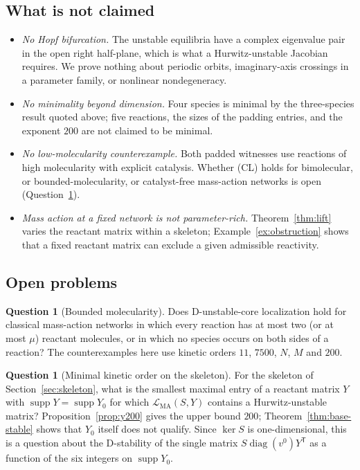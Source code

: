 \documentclass[11pt,a4paper]{article}
\theoremstyle{plain}
\theoremstyle{definition}
\newtheorem{question}[theorem]{Question}
\theoremstyle{remark}
\newcommand{\diag}{\operatorname{diag}}
\newcommand{\supp}{\operatorname{supp}}
\newcommand{\LMA}{\mathcal{L}_{\mathrm{MA}}}
\begin{document}
\subsection{What is not claimed}

\begin{itemize}
\item \emph{No Hopf bifurcation.} The unstable equilibria have a complex eigenvalue pair in the open right half-plane, which is what a Hurwitz-unstable Jacobian requires. We prove nothing about periodic orbits, imaginary-axis crossings in a parameter family, or nonlinear nondegeneracy.
\item \emph{No minimality beyond dimension.} Four species is minimal by the three-species result quoted above; five reactions, the sizes of the padding entries, and the exponent $200$ are not claimed to be minimal.
\item \emph{No low-molecularity counterexample.} Both padded witnesses use reactions of high molecularity with explicit catalysis. Whether (CL) holds for bimolecular, or bounded-molecularity, or catalyst-free mass-action networks is open (Question~\ref{q:molecularity}).
\item \emph{Mass action at a fixed network is not parameter-rich.} Theorem~\ref{thm:lift} varies the reactant matrix within a skeleton; Example~\ref{ex:obstruction} shows that a fixed reactant matrix can exclude a given admissible reactivity.
\end{itemize}

\subsection{Open problems}

\begin{question}[Bounded molecularity]\label{q:molecularity}
Does D-unstable-core localization hold for classical mass-action networks in which every reaction has at most two (or at most $\mu$) reactant molecules, or in which no species occurs on both sides of a reaction? The counterexamples here use kinetic orders $11$, $7500$, $N$, $M$ and $200$.
\end{question}

\begin{question}[Minimal kinetic order on the skeleton]
For the skeleton of Section~\ref{sec:skeleton}, what is the smallest maximal entry of a reactant matrix $Y$ with $\supp Y=\supp Y_0$ for which $\LMA(S,Y)$ contains a Hurwitz-unstable matrix? Proposition~\ref{prop:y200} gives the upper bound $200$; Theorem~\ref{thm:base-stable} shows that $Y_0$ itself does not qualify. Since $\ker S$ is one-dimensional, this is a question about the D-stability of the single matrix $S\diag(v^0)Y^{\mathsf T}$ as a function of the six integers on $\supp Y_0$.
\end{question}
\end{document}
